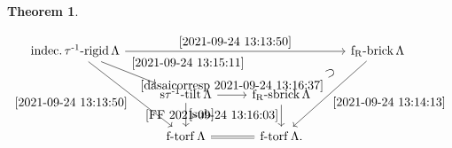 \documentclass[pdftex,a4paper]{article}
\numberwithin{equation}{subsection}
\theoremstyle{definition}
\newtheorem{theorem}{Theorem}[section]
\newcommand{\itauirigid}{\operatorname{\mathrm{indec.\tau^{-1}-rigid}}}
\newcommand{\stauitilt}{\operatorname{\mathrm{s\tau^{-1}-tilt}}}
\newcommand{\ftorf}{\operatorname{\mathrm{f-torf}}}
\newcommand{\frsbrick}{\operatorname{\mathrm{f_R-sbrick}}}
\newcommand{\frbrick}{\operatorname{\mathrm{f_R-brick}}}
\begin{document}
\begin{theorem}
\begin{enumerate}
\begin{equation}
			      \begin{tikzcd}
				      \itauirigid \Lambda \ar[rrr,"\eqref{2021-09-24 13:13:50}"]\ar[dr,"\eqref{2021-09-24 13:15:11}"]\ar[ddr,"\eqref{2021-09-24 13:13:50}"']& & &\frbrick \Lambda \ar[dl,phantom,"\supset"sloped] \ar[ddl,"\eqref{2021-09-24 13:14:13}"]\\
				      &\stauitilt \Lambda \ar[d,"\eqref{sub}"] \ar[r,"\eqref{dasaicorresp 2021-09-24 13:16:37}"]& \frsbrick \Lambda \ar[d,"\eqref{FF 2021-09-24 13:16:03}"']&
				      \\
				      &\ftorf \Lambda \ar[r,equal]& \ftorf \Lambda.&
			      \end{tikzcd}
		      \end{equation}
	\end{enumerate}
\end{theorem}
\end{document}
